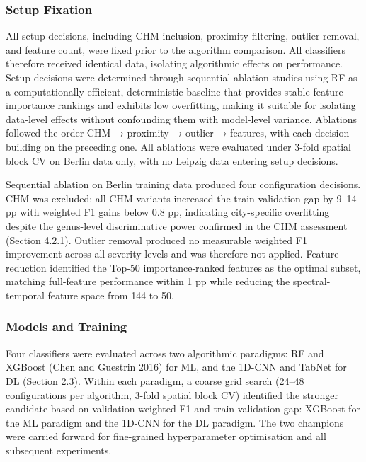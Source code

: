 \documentclass[11pt,a4paper]{scrartcl}
\begin{document}
\subsubsection{Setup Fixation}\label{setup-fixation}

All setup decisions, including CHM inclusion, proximity filtering,
outlier removal, and feature count, were fixed prior to the algorithm
comparison. All classifiers therefore received identical data, isolating
algorithmic effects on performance. Setup decisions were determined
through sequential ablation studies using RF as a computationally
efficient, deterministic baseline that provides stable feature
importance rankings and exhibits low overfitting, making it suitable for
isolating data-level effects without confounding them with model-level
variance. Ablations followed the order CHM → proximity → outlier →
features, with each decision building on the preceding one. All
ablations were evaluated under 3-fold spatial block CV on Berlin data
only, with no Leipzig data entering setup decisions.

Sequential ablation on Berlin training data produced four configuration
decisions. CHM was excluded: all CHM variants increased the
train-validation gap by 9--14 pp with weighted F1 gains below 0.8 pp,
indicating city-specific overfitting despite the genus-level
discriminative power confirmed in the CHM assessment (Section 4.2.1).
Outlier removal produced no measurable weighted F1 improvement across
all severity levels and was therefore not applied. Feature reduction
identified the Top-50 importance-ranked features as the optimal subset,
matching full-feature performance within 1 pp while reducing the
spectral-temporal feature space from 144 to 50.

\subsubsection{Models and Training}\label{models-and-training}

Four classifiers were evaluated across two algorithmic paradigms: RF and
XGBoost (Chen and Guestrin 2016) for ML, and the 1D-CNN and TabNet for
DL (Section 2.3). Within each paradigm, a coarse grid search (24--48
configurations per algorithm, 3-fold spatial block CV) identified the
stronger candidate based on validation weighted F1 and train-validation
gap: XGBoost for the ML paradigm and the 1D-CNN for the DL paradigm. The
two champions were carried forward for fine-grained hyperparameter
optimisation and all subsequent experiments.
\end{document}
